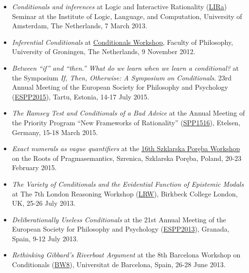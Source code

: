 \documentclass[a4paper,12pt]{article}
\begin{document}
\begin{small}
\begin{itemize}
    \item \emph{Conditionals and inferences} at Logic and Interactive
    Rationality (\href{http://www.illc.uva.nl/lgc/seminar/}{LIRa})
    Seminar at the Institute of Logic, Language, and Computation,
    University of Amsterdam, The Netherlands, 7 March 2013.
  
    \item \emph{Inferential Conditionals} at
    \href{https://sites.google.com/site/jannekehuitink/workshop}{Conditionals Workshop}, Faculty of Philosophy, University of Groningen, The Netherlands, 9 November 2012.
  \end{itemize}
  
  \begin{itemize}
    \item \emph{Between ``if'' and ``then.'' What do we learn when we learn a conditional?} at the Symposium \emph{If, Then, Otherwise: A Symposium on Conditionals}. 23rd Annual Meeting of the European Society for Philosophy and Psychology (\href{http://espp2015.ut.ee}{ESPP2015}), Tartu, Estonia, 14-17 July 2015.

    \item \emph{The Ramsey Test and Conditionals of a Bad Advice} at the Annual Meeting of the Priority Program ``New Frameworks of Rationality'' (\href{http://www.spp1516.de}{SPP1516}), Etelsen, Germany, 15-18 March 2015.

    \item \emph{Exact numerals as vague quantifiers} at the \href{https://sites.google.com/site/szklarskaporebaworkshop16/}{16th Szklarska Poręba Workshop} on the Roots of Pragmasemantics, Szrenica, Szklarska Poręba, Poland, 20-23 February 2015.

    \item \emph{The Variety of Conditionals and the Evidential Function of Epistemic Modals} at The 7th London Reasoning Workshop (\href{http://www.bbk.ac.uk/psychology/about-us/events/the-7th-london-reasoning-workshop}{LRW}), Birkbeck College London, UK, 25-26 July 2013.

    \item \emph{Deliberationally Useless Conditionals} at the 21st Annual Meeting of the European Society for Philosophy and Psychology (\href{http://espp2013.com}{ESPP2013}), Granada, Spain, 9-12 July 2013.

    \item \emph{Rethinking Gibbard’s Riverboat Argument} at the 8th Barcelona Workshop on Conditionals
    (\href{http://www.ub.edu/logosbw/bw8/index.html}{BW8}), Universitat de Barcelona, Spain, 26-28 June 2013.
    

\end{itemize}
\end{small}
\end{document}
